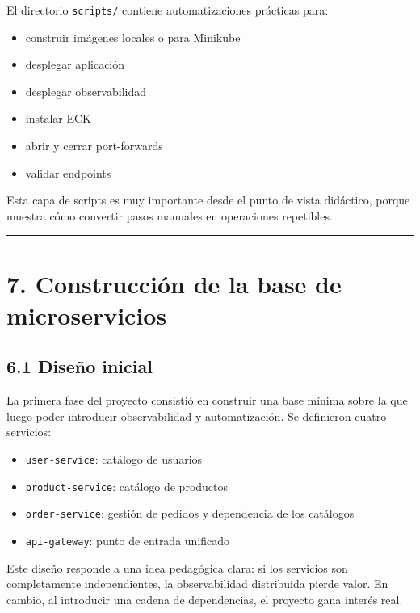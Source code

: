\documentclass[
a4paper,
12pt]{report}
\providecommand{\tightlist}{%
  \setlength{\itemsep}{0pt}\setlength{\parskip}{0pt}}
\begin{document}
El directorio \texttt{scripts/} contiene automatizaciones prácticas
para:

\begin{itemize}
\tightlist
\item
  construir imágenes locales o para Minikube
\item
  desplegar aplicación
\item
  desplegar observabilidad
\item
  instalar ECK
\item
  abrir y cerrar port-forwards
\item
  validar endpoints
\end{itemize}

Esta capa de scripts es muy importante desde el punto de vista
didáctico, porque muestra cómo convertir pasos manuales en operaciones
repetibles.

\begin{center}\rule{0.5\linewidth}{0.5pt}\end{center}

\chapter{7. Construcción de la base de
microservicios}\label{construcciuxf3n-de-la-base-de-microservicios}

\section{6.1 Diseño inicial}\label{diseuxf1o-inicial}

La primera fase del proyecto consistió en construir una base mínima
sobre la que luego poder introducir observabilidad y automatización. Se
definieron cuatro servicios:

\begin{itemize}
\tightlist
\item
  \texttt{user-service}: catálogo de usuarios
\item
  \texttt{product-service}: catálogo de productos
\item
  \texttt{order-service}: gestión de pedidos y dependencia de los
  catálogos
\item
  \texttt{api-gateway}: punto de entrada unificado
\end{itemize}

Este diseño responde a una idea pedagógica clara: si los servicios son
completamente independientes, la observabilidad distribuida pierde
valor. En cambio, al introducir una cadena de dependencias, el proyecto
gana interés real.
\end{document}
